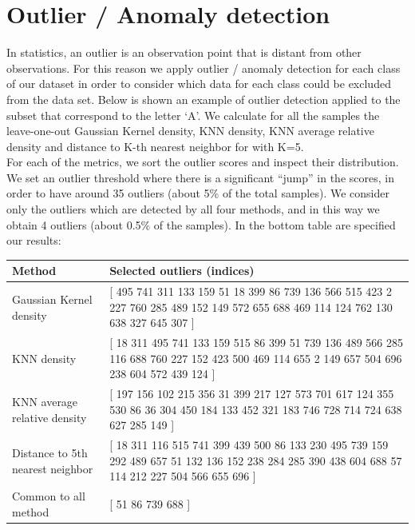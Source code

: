 \chapter*{Outlier / Anomaly detection}

In statistics, an outlier is an observation point that is distant from other observations. For this reason we apply outlier / anomaly detection for each class of our dataset in order to consider which data for each class could be excluded from the data set.
Below is shown an example of outlier detection applied to the subset that correspond to the letter `A'.
We calculate for all the samples the leave-one-out Gaussian Kernel density, KNN density, KNN average relative density and distance to K-th nearest neighbor for with K=5.\\
For each of the metrics, we sort the outlier scores and inspect their distribution. We set an outlier threshold where there is a significant ``jump'' in the scores, in order to have around 35 outliers (about 5\% of the total samples). We consider only the outliers which are detected by all four methods, and in this way we obtain 4 outliers (about 0.5\% of the samples).
In the bottom table are specified our results:
\begin{center}
    \begin{tabular}{ | p{3cm} | p{9cm} |}
    \hline
    \textbf{Method}  & \textbf{Selected outliers (indices)} \\
    \hline
    Gaussian Kernel density & [
   495
   741
   311
   133
   159
    51
    18
   399
    86
   739
   136
   566
   515
   423
     2
   227
   760
   285
   489
   152
   149
   572
   655
   688
   469
   114
   124
   762
   130
   638
   327
   645
   307 ]\\
    \hline
    KNN density & [ 18
   311
   495
   741
   133
   159
   515
    86
   399
    51
   739
   136
   489
   566
   285
   116
   688
   760
   227
   152
   423
   500
   469
   114
   655
     2
   149
   657
   504
   696
   238
   604
   572
   439
   124 ] \\
    \hline
    KNN average relative density & [ 197
   156
   102
   215
   356
    31
   399
   217
   127
   573
   701
   617
   124
   355
   530
    86
    36
   304
   450
   184
   133
   452
   321
   183
   746
   728
   714
   724
   638
   627
   285
   149 ]\\
    \hline
    Distance to 5th nearest neighbor & [     18
   311
   116
   515
   741
   399
   439
   500
    86
   133
   230
   495
   739
   159
   292
   489
   657
    51
   132
   136
   152
   238
   284
   285
   390
   438
   604
   688
    57
   114
   212
   227
   504
   566
   655
   696 ]\\
    \hline
    Common to all method & [ 51    86   739   688 ]\\
    \hline
    \end{tabular}
\end{center}

